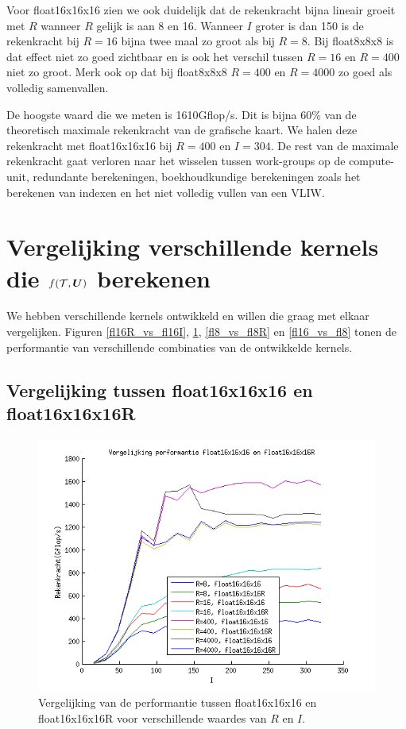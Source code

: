 Voor float16x16x16 zien we ook duidelijk dat de rekenkracht bijna lineair groeit met $R$ wanneer $R$ gelijk is aan 8 en 16. Wanneer $I$ groter is dan 150 is de rekenkracht bij $R=16$ bijna twee maal zo groot als bij $R=8$. Bij float8x8x8 is dat effect niet zo goed zichtbaar en is ook het verschil tussen $R=16$ en $R=400$ niet zo groot. Merk ook op dat bij float8x8x8 $R=400$ en $R=4000$ zo goed als volledig samenvallen.

De hoogste waard die we meten is 1610Gflop/s. Dit is bijna 60\% van de theoretisch maximale rekenkracht van de grafische kaart. We halen deze rekenkracht met float16x16x16 bij $R=400$ en $I=304$. De rest van de maximale rekenkracht gaat verloren naar het wisselen tussen work-groups op de compute-unit, redundante berekeningen, boekhoudkundige berekeningen zoals het berekenen van indexen en het niet volledig vullen van een VLIW.

\section{Vergelijking verschillende kernels die $f(\mathcal{T}, \boldsymbol{U})$ berekenen}
We hebben verschillende kernels ontwikkeld en willen die graag met elkaar vergelijken. Figuren \ref{fl16R_vs_fl16I}, \ref{fl16_vs_fl16R}, \ref{fl8_vs_fl8R} en \ref{fl16_vs_fl8} tonen de performantie van verschillende combinaties van de ontwikkelde kernels.

\subsection{Vergelijking tussen float16x16x16 en float16x16x16R}
\begin{figure}[h!]
\centering
\includegraphics{fl16_vs_fl16R}
\caption{\label{fl16_vs_fl16R} Vergelijking van de performantie tussen float16x16x16 en float16x16x16R voor verschillende waardes van $R$ en $I$.}
\end{figure}

